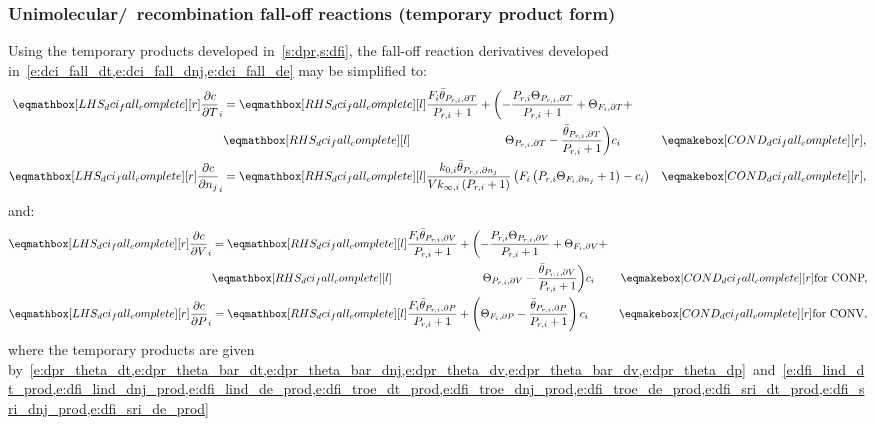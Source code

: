 \documentclass[12pt]{article}
\newcommand{\conp}{CONP}
\newcommand{\conv}{CONV}
\newcommand{\dconp}{\ifmmode\text{for \conp,}\else for \conp,\fi}
\newcommand{\dconv}{\ifmmode\text{for \conv,}\else for \conv.\fi}
\begin{document}
\subsubsection{Unimolecular\slash~recombination fall-off reactions (temporary product form)}
Using the temporary products developed in~\cref{s:dpr,s:dfi}, the fall-off reaction derivatives developed in~\cref{e:dci_fall_dt,e:dci_fall_dnj,e:dci_fall_de} may be simplified to:
\begin{align}
\lhs{dci_fall_complete}{\frac{\partial c }{\partial T }_{i}} &= \rhs{dci_fall_complete}{\frac{F_{i} \bar{\theta}_{P_{r, i}, \partial T}}{P_{r, i} + 1} + \biggl(- \frac{P_{r, i} \Theta_{P_{r,i}, \partial T}}{P_{r, i} + 1} + \Theta_{F_i, \partial T} + } & \nonumber \\
							     &  \rhs{dci_fall_complete}{\mathindent[largerindentpleas] \Theta_{P_{r,i}, \partial T} - \frac{\bar{\theta}_{P_{r, i}, \partial T}}{P_{r, i} + 1}\biggr) c_{i}} & \cond{dci_fall_complete}{,} \\
\lhs{dci_fall_complete}{\frac{\partial c }{\partial {n_j} }_{i}} &= \rhs{dci_fall_complete}{\frac{k_{0, i} \bar{\theta}_{P_{r, i}, \partial n_j}}{V k_{\infty, i} \left(P_{r, i} + 1\right)} \left(F_{i} \left(P_{r, i} \Theta_{F_i, \partial n_j} + 1\right) - c_{i}\right)} & \cond{dci_fall_complete}{,}
\end{align}
and:
\begin{subequations}
 \begin{align}
  \lhs{dci_fall_complete}{\frac{\partial c }{\partial V }_{i}} &= \rhs{dci_fall_complete}{\frac{F_{i} \bar{\theta}_{P_{r, i}, \partial V}}{P_{r, i} + 1} + \biggl(- \frac{P_{r, i} \Theta_{P_{r,i}, \partial V}}{P_{r, i} + 1} + \Theta_{F_i, \partial V} + } & \nonumber \\
							       &  \rhs{dci_fall_complete}{\mathindent[largerindentpleas] \Theta_{P_{r,i}, \partial V} - \frac{\bar{\theta}_{P_{r, i}, \partial V}}{P_{r, i} + 1} \biggr) c_{i}} & \cond{dci_fall_complete}{\dconp} \\
  \lhs{dci_fall_complete}{\frac{\partial c }{\partial P }_{i}} &= \rhs{dci_fall_complete}{\frac{F_{i} \bar{\theta}_{P_{r, i}, \partial P}}{P_{r, i} + 1} + \left(\Theta_{F_i, \partial P} - \frac{\bar{\theta}_{P_{r, i}, \partial P}}{P_{r, i} + 1}\right) c_{i}} & \cond{dci_fall_complete}{\dconv}
 \end{align}
\end{subequations}
where the temporary products are given by~\cref{e:dpr_theta_dt,e:dpr_theta_bar_dt,e:dpr_theta_bar_dnj,e:dpr_theta_dv,e:dpr_theta_bar_dv,e:dpr_theta_dp}~and~\cref{e:dfi_lind_dt_prod,e:dfi_lind_dnj_prod,e:dfi_lind_de_prod,e:dfi_troe_dt_prod,e:dfi_troe_dnj_prod,e:dfi_troe_de_prod,e:dfi_sri_dt_prod,e:dfi_sri_dnj_prod,e:dfi_sri_de_prod}
\end{document}
